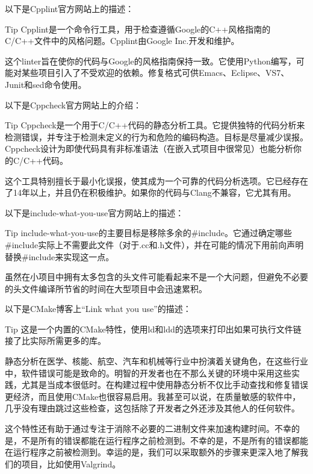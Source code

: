 
以下是Cpplint官方网站上的描述：

\begin{myTip}{Tip}
Cpplint是一个命令行工具，用于检查遵循Google的C++风格指南的C/C++文件中的风格问题。Cpplint由Google Inc.开发和维护。
\end{myTip}

这个linter旨在使你的代码与Google的风格指南保持一致。它使用Python编写，可能对某些项目引入了不受欢迎的依赖。修复格式可供Emacs、Eclipse、VS7、Junit和sed命令使用。


以下是Cppcheck官方网站上的介绍：

\begin{myTip}{Tip}
Cppcheck是一个用于C/C++代码的静态分析工具。它提供独特的代码分析来检测错误，并专注于检测未定义的行为和危险的编码构造。目标是尽量减少误报。Cppcheck设计为即使代码具有非标准语法（在嵌入式项目中很常见）也能分析你的C/C++代码。
\end{myTip}

这个工具特别擅长于最小化误报，使其成为一个可靠的代码分析选项。它已经存在了14年以上，并且仍在积极维护。如果你的代码与Clang不兼容，它尤其有用。


以下是include-what-you-use官方网站上的描述：

\begin{myTip}{Tip}
include-what-you-use的主要目标是移除多余的\#include。它通过确定哪些\#include实际上不需要此文件（对于.cc和.h文件），并在可能的情况下用前向声明替换\#include来实现这一点。
\end{myTip}

虽然在小项目中拥有太多包含的头文件可能看起来不是一个大问题，但避免不必要的头文件编译所节省的时间在大型项目中会迅速累积。


以下是CMake博客上“Link what you use”的描述：

\begin{myTip}{Tip}
这是一个内置的CMake特性，使用ld和ldd的选项来打印出如果可执行文件链接了比实际所需更多的库。
\end{myTip}

静态分析在医学、核能、航空、汽车和机械等行业中扮演着关键角色，在这些行业中，软件错误可能是致命的。明智的开发者也在不那么关键的环境中采用这些实践，尤其是当成本很低时。在构建过程中使用静态分析不仅比手动查找和修复错误更经济，而且使用CMake也很容易启用。我甚至可以说，在质量敏感的软件中，几乎没有理由跳过这些检查，这包括除了开发者之外还涉及其他人的任何软件。

这个特性还有助于通过专注于消除不必要的二进制文件来加速构建时间。不幸的是，不是所有的错误都能在运行程序之前检测到。不幸的是，不是所有的错误都能在运行程序之前被检测到。幸运的是，我们可以采取额外的步骤来更深入地了解我们的项目，比如使用Valgrind。









